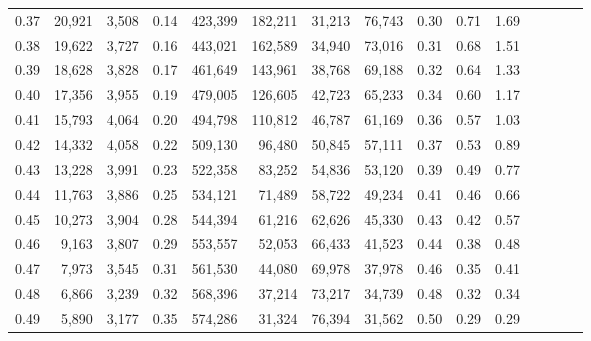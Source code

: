 \begin{tabular}{rrrcrrrrrrrrrrr}
0.37 &  20,921 &  3,508 &                                       0.14 &  423,399 &  182,211 &   31,213 &   76,743 &  0.30 &  0.71 &                         1.69 \\
0.38 &  19,622 &  3,727 &                                       0.16 &  443,021 &  162,589 &   34,940 &   73,016 &  0.31 &  0.68 &                         1.51 \\
0.39 &  18,628 &  3,828 &                                       0.17 &  461,649 &  143,961 &   38,768 &   69,188 &  0.32 &  0.64 &                         1.33 \\
0.40 &  17,356 &  3,955 &                                       0.19 &  479,005 &  126,605 &   42,723 &   65,233 &  0.34 &  0.60 &                         1.17 \\
0.41 &  15,793 &  4,064 &                                       0.20 &  494,798 &  110,812 &   46,787 &   61,169 &  0.36 &  0.57 &                         1.03 \\
0.42 &  14,332 &  4,058 &                                       0.22 &  509,130 &   96,480 &   50,845 &   57,111 &  0.37 &  0.53 &                         0.89 \\
0.43 &  13,228 &  3,991 &                                       0.23 &  522,358 &   83,252 &   54,836 &   53,120 &  0.39 &  0.49 &                         0.77 \\
0.44 &  11,763 &  3,886 &                                       0.25 &  534,121 &   71,489 &   58,722 &   49,234 &  0.41 &  0.46 &                         0.66 \\
0.45 &  10,273 &  3,904 &                                       0.28 &  544,394 &   61,216 &   62,626 &   45,330 &  0.43 &  0.42 &                         0.57 \\
0.46 &   9,163 &  3,807 &                                       0.29 &  553,557 &   52,053 &   66,433 &   41,523 &  0.44 &  0.38 &                         0.48 \\
0.47 &   7,973 &  3,545 &                                       0.31 &  561,530 &   44,080 &   69,978 &   37,978 &  0.46 &  0.35 &                         0.41 \\
0.48 &   6,866 &  3,239 &                                       0.32 &  568,396 &   37,214 &   73,217 &   34,739 &  0.48 &  0.32 &                         0.34 \\
0.49 &   5,890 &  3,177 &                                       0.35 &  574,286 &   31,324 &   76,394 &   31,562 &  0.50 &  0.29 &                         0.29 \\

\end{tabular}
